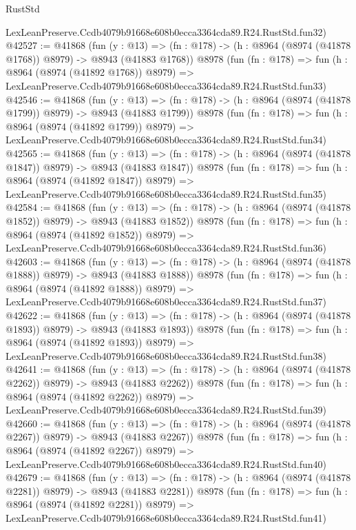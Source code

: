 \begin{lexlean}{RustStd}
\begin{coremodule}
    LexLeanPreserve.Ccdb4079b91668e608b0ecca3364cda89.R24.RustStd.fun32)
@42527 := @41868
    (fun (y : @13) =>
    (fn : @178) -> (h : @8964 (@8974 (@41878 @1768)) @8979) -> @8943 (@41883 @1768))
    @8978
    (fun (fn : @178) =>
    fun (h : @8964 (@8974 (@41892 @1768)) @8979) =>
    LexLeanPreserve.Ccdb4079b91668e608b0ecca3364cda89.R24.RustStd.fun33)
@42546 := @41868
    (fun (y : @13) =>
    (fn : @178) -> (h : @8964 (@8974 (@41878 @1799)) @8979) -> @8943 (@41883 @1799))
    @8978
    (fun (fn : @178) =>
    fun (h : @8964 (@8974 (@41892 @1799)) @8979) =>
    LexLeanPreserve.Ccdb4079b91668e608b0ecca3364cda89.R24.RustStd.fun34)
@42565 := @41868
    (fun (y : @13) =>
    (fn : @178) -> (h : @8964 (@8974 (@41878 @1847)) @8979) -> @8943 (@41883 @1847))
    @8978
    (fun (fn : @178) =>
    fun (h : @8964 (@8974 (@41892 @1847)) @8979) =>
    LexLeanPreserve.Ccdb4079b91668e608b0ecca3364cda89.R24.RustStd.fun35)
@42584 := @41868
    (fun (y : @13) =>
    (fn : @178) -> (h : @8964 (@8974 (@41878 @1852)) @8979) -> @8943 (@41883 @1852))
    @8978
    (fun (fn : @178) =>
    fun (h : @8964 (@8974 (@41892 @1852)) @8979) =>
    LexLeanPreserve.Ccdb4079b91668e608b0ecca3364cda89.R24.RustStd.fun36)
@42603 := @41868
    (fun (y : @13) =>
    (fn : @178) -> (h : @8964 (@8974 (@41878 @1888)) @8979) -> @8943 (@41883 @1888))
    @8978
    (fun (fn : @178) =>
    fun (h : @8964 (@8974 (@41892 @1888)) @8979) =>
    LexLeanPreserve.Ccdb4079b91668e608b0ecca3364cda89.R24.RustStd.fun37)
@42622 := @41868
    (fun (y : @13) =>
    (fn : @178) -> (h : @8964 (@8974 (@41878 @1893)) @8979) -> @8943 (@41883 @1893))
    @8978
    (fun (fn : @178) =>
    fun (h : @8964 (@8974 (@41892 @1893)) @8979) =>
    LexLeanPreserve.Ccdb4079b91668e608b0ecca3364cda89.R24.RustStd.fun38)
@42641 := @41868
    (fun (y : @13) =>
    (fn : @178) -> (h : @8964 (@8974 (@41878 @2262)) @8979) -> @8943 (@41883 @2262))
    @8978
    (fun (fn : @178) =>
    fun (h : @8964 (@8974 (@41892 @2262)) @8979) =>
    LexLeanPreserve.Ccdb4079b91668e608b0ecca3364cda89.R24.RustStd.fun39)
@42660 := @41868
    (fun (y : @13) =>
    (fn : @178) -> (h : @8964 (@8974 (@41878 @2267)) @8979) -> @8943 (@41883 @2267))
    @8978
    (fun (fn : @178) =>
    fun (h : @8964 (@8974 (@41892 @2267)) @8979) =>
    LexLeanPreserve.Ccdb4079b91668e608b0ecca3364cda89.R24.RustStd.fun40)
@42679 := @41868
    (fun (y : @13) =>
    (fn : @178) -> (h : @8964 (@8974 (@41878 @2281)) @8979) -> @8943 (@41883 @2281))
    @8978
    (fun (fn : @178) =>
    fun (h : @8964 (@8974 (@41892 @2281)) @8979) =>
    LexLeanPreserve.Ccdb4079b91668e608b0ecca3364cda89.R24.RustStd.fun41)

\end{coremodule}
\end{lexlean}
